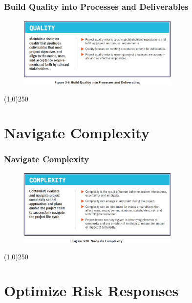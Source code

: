 \begin{frame}
\frametitle{Build Quality into Processes and Deliverables}
 \begin{figure}
    \centering
        \includegraphics[width = 8cm]{../images/standard/Fig3-9.jpg}
    \label{standardfig:3-9}
 \end{figure}
\end{frame}
\begin{center}\line(1,0){250}\end{center}



\section{Navigate Complexity}


\begin{frame}
\frametitle{Navigate Complexity}
 \begin{figure}
    \centering
        \includegraphics[width = 8cm]{../images/standard/Fig3-10.jpg}
    \label{standardfig:3-10}
 \end{figure}
\end{frame}
\begin{center}\line(1,0){250}\end{center}



\section{Optimize Risk Responses}

